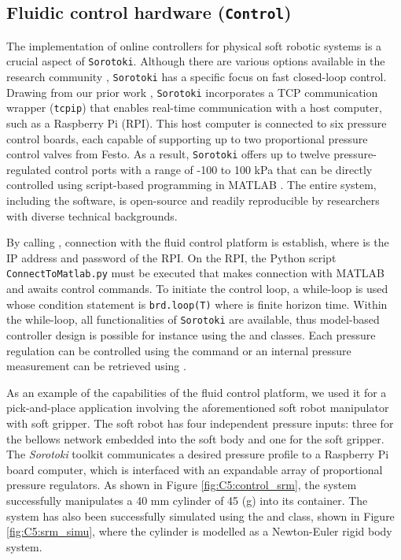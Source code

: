 
\subsection{Fluidic control hardware (\texttt{Control})}
\label{sec:C5:control}
The implementation of online controllers for physical soft robotic systems is a crucial aspect of \texttt{Sorotoki}. Although there are various options available in the research community \cite{Xavier2022Jun}, \texttt{Sorotoki} has a specific focus on fast closed-loop control. Drawing from our prior work \cite{Caasenbrood2022Apr}, \texttt{Sorotoki} incorporates a TCP communication wrapper (\texttt{tcpip}) that enables real-time communication with a host computer, such as a Raspberry Pi (RPI). This host computer is connected to six pressure control boards, each capable of supporting up to two proportional pressure control valves from Festo. As a result, \texttt{Sorotoki} offers up to twelve pressure-regulated control ports with a range of -100 to 100 kPa that can be directly controlled using script-based programming in {MATLAB} . The entire system, including the software, is open-source and readily reproducible by researchers with diverse technical backgrounds.

By calling , connection with the fluid control platform is establish, where  is the IP address and password of the RPI. On the RPI, the Python script \texttt{ConnectToMatlab.py} must be executed that makes connection with {MATLAB} and awaits control commands. To initiate the control loop, a while-loop is used whose condition statement is \texttt{brd.loop(T)} where  is finite horizon time. Within the while-loop, all functionalities of \texttt{Sorotoki} are available, thus model-based controller design is possible for instance using the  and  classes. Each pressure regulation can be controlled using the command  or an internal pressure measurement can be retrieved using . \\ \vspace{-5mm}

\begin{example}
As an example of the capabilities of the fluid control platform, we used it for a pick-and-place application involving the aforementioned soft robot manipulator with soft gripper. The soft robot has four independent pressure inputs: three for the bellows network embedded into the soft body and one for the soft gripper. The \textit{Sorotoki} toolkit communicates a desired pressure profile to a Raspberry Pi board computer, which is interfaced with an expandable array of proportional pressure regulators. As shown in Figure \ref{fig:C5:control_srm}, the system successfully manipulates a 40 mm cylinder of 45 (g) into its container. The system has also been successfully simulated using the  and  class, shown in Figure \ref{fig:C5:srm_simu}, where the cylinder is modelled as a Newton-Euler rigid body system.
\end{example}

